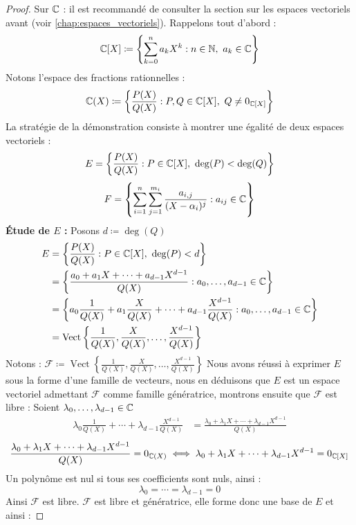 \begin{proof}\cite{math-sup.fr_decomp}
    Sur $\mathbb{C}$ : il est recommandé de consulter la section sur les espaces vectoriels avant (voir \autoref{chap:espaces_vectoriels}).
    Rappelons tout d'abord :
    \[ \mathbb{C}[X] \coloneqq \left\{ \sum_{k = 0}^{n} a_k X^k : n \in \mathbb{N},\ a_k \in \mathbb{C} \right\} \]
    Notons l'espace des fractions rationnelles :
    \[ \mathbb{C}(X) \coloneqq \left\{ \frac{P(X)}{Q(X)} : P, Q \in \mathbb{C}[X],\ Q \neq 0_{\mathbb{C}[X]} \right\} \]
    La stratégie de la démonstration consiste à montrer une égalité de deux espaces vectoriels :
    \[ E = \left\{ \frac{P(X)}{Q(X)} : P \in \mathbb{C}[X],\ \deg(P) < \deg(Q) \right\} \]
    \[ F = \left\{ \sum_{i = 1}^{n} \sum_{j = 1}^{m_i} \frac{a_{i, j}}{(X - \alpha_i)^{j}} : a_{ij} \in \mathbb{C} \right\} \]
    \textbf{\'Etude de $E$ :} Posons $d \coloneqq \deg(Q)$
    \begin{align*}
        E &= \left\{ \frac{P(X)}{Q(X)} : P \in \mathbb{C}[X],\ \deg(P) < d \right\} \\
          &= \left\{ \frac{a_0 + a_1X + \cdots + a_{d - 1} X^{d - 1}}{Q(X)} : a_0, \ldots, a_{d - 1} \in \mathbb{C} \right\} \\
          &= \left\{ a_0 \frac{1}{Q(X)} + a_1 \frac{X}{Q(X)} + \cdots + a_{d - 1} \frac{X^{d-1}}{Q(X)} : a_0, \ldots, a_{d - 1} \in \mathbb{C} \right\} \\
          &= \operatorname{Vect}\left\{ \frac{1}{Q(X)}, \frac{X}{Q(X)}, \ldots, \frac{X^{d-1}}{Q(X)} \right\}
    \end{align*}
    Notons : $\mathcal{F} \coloneqq \operatorname{Vect}\left\{ \frac{1}{Q(X)}, \frac{X}{Q(X)}, \ldots, \frac{X^{d-1}}{Q(X)} \right\}$
    Nous avons réussi à exprimer $E$ sous la forme d'une famille de vecteurs, nous en déduisons que $E$ est un espace vectoriel admettant $\mathcal{F}$ comme famille génératrice, montrons ensuite que $\mathcal{F}$ est libre :
    Soient $ \lambda_0,\ldots,\lambda_{d-1} \in \mathbb{C}$
    \begin{align*}
        \lambda_0 \frac{1}{Q(X)} + \cdots + \lambda_{d - 1} \frac{X^{d-1}}{Q(X)} &= \frac{\lambda_0 + \lambda_{1} X + \cdots + \lambda_{d - 1} X^{d - 1}}{Q(X)}
    \end{align*}
    \[ \frac{\lambda_0 + \lambda_{1} X + \cdots + \lambda_{d - 1} X^{d - 1}}{Q(X)} = 0_{\mathbb{C}(X)} \iff \lambda_0 + \lambda_{1} X + \cdots + \lambda_{d - 1} X^{d - 1} = 0_{\mathbb{C}[X]} \]
    Un polynôme est nul si tous ses coefficients sont nuls, ainsi :
    \[ \lambda_0 = \cdots = \lambda_{d-1} = 0 \]
    Ainsi $\mathcal{F}$ est libre. $\mathcal{F}$ est libre et génératrice, elle forme donc une base de $E$ et ainsi : 

\end{proof}
